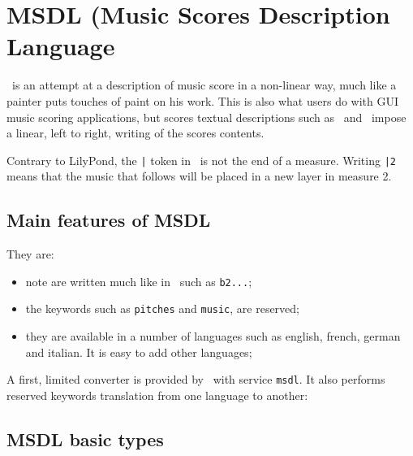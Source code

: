 
\chapter{MSDL (Music Scores Description Language}


\msdlLang\ is an attempt at a description of music score in a non-linear way, much like a painter puts touches of paint on his work. This is also what users do with GUI music scoring applications, but scores textual descriptions such as \lily\ and \guido\ impose a linear, left to right, writing of the scores contents.

Contrary to LilyPond, the {\tt |} token in \msdlLang\ is not the end of a measure. Writing {\tt |2} means that the music that follows will be placed in a new layer in measure 2.


\section{Main features of MSDL}

They are:
\begin{itemize}
\item note are written much like in \lily\, such as {\tt b2...};
\item the keywords such as {\tt pitches} and {\tt music}, are reserved;
\item they are available in a number of languages such as english, french, german and italian. It is easy to add other languages;
\end{itemize}

A first, limited converter is provided by \mf\, with service {\tt msdl}. It also performs reserved keywords translation from one language to another:


\section{MSDL basic types}\label{MSDL basic types}

